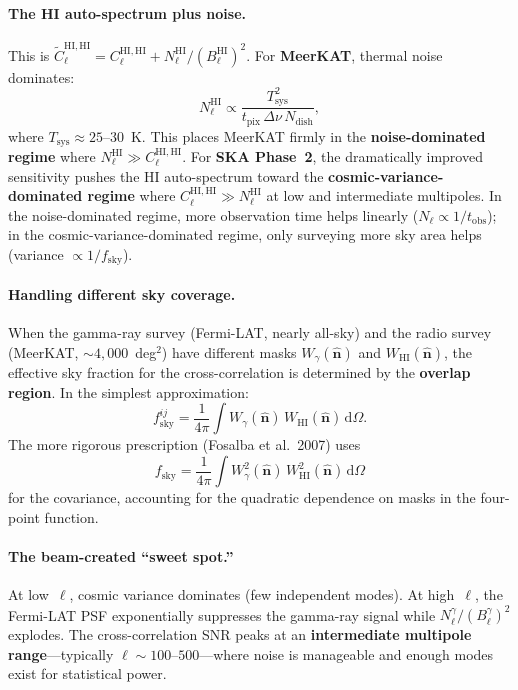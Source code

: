\documentclass[10pt,a4paper]{article}
\newcommand{\Cl}{C_\ell}
\newcommand{\fsky}{f_{\mathrm{sky}}}
\newcommand{\nhat}{\hat{\mathbf{n}}}
\begin{document}
\paragraph{The HI auto-spectrum plus noise.}
This is $\tilde{C}_\ell^{\mathrm{HI,HI}} = \Cl^{\mathrm{HI,HI}} + N_\ell^{\mathrm{HI}}/(B_\ell^{\mathrm{HI}})^2$. For \textbf{MeerKAT}, thermal noise dominates:
\begin{equation}
N_\ell^{\mathrm{HI}} \propto \frac{T_{\mathrm{sys}}^2}
{t_{\mathrm{pix}}\, \Delta\nu\, N_{\mathrm{dish}}},
\end{equation}
where $T_{\mathrm{sys}} \approx 25$--$30$~K. This places MeerKAT firmly in the \textbf{noise-dominated regime} where $N_\ell^{\mathrm{HI}} \gg \Cl^{\mathrm{HI,HI}}$. For \textbf{SKA Phase~2}, the dramatically improved sensitivity pushes the HI auto-spectrum toward the \textbf{cosmic-variance-dominated regime} where $\Cl^{\mathrm{HI,HI}} \gg N_\ell^{\mathrm{HI}}$ at low and intermediate multipoles. In the noise-dominated regime, more observation time helps linearly ($N_\ell \propto 1/t_{\mathrm{obs}}$); in the cosmic-variance-dominated regime, only surveying more sky area helps (variance $\propto 1/\fsky$).

\paragraph{Handling different sky coverage.}
When the gamma-ray survey (Fermi-LAT, nearly all-sky) and the radio survey (MeerKAT, $\sim 4{,}000$~deg$^2$) have different masks $W_\gamma(\nhat)$ and $W_{\mathrm{HI}}(\nhat)$, the effective sky fraction for the cross-correlation is determined by the \textbf{overlap region}. In the simplest approximation:
\begin{equation}
\fsky^{ij} = \frac{1}{4\pi}\int W_\gamma(\nhat)\, W_{\mathrm{HI}}(\nhat)\, \mathrm{d}\Omega.
\end{equation}
The more rigorous prescription (Fosalba et al.\ 2007) uses
\begin{equation}
\fsky = \frac{1}{4\pi}\int W_\gamma^2(\nhat)\, W_{\mathrm{HI}}^2(\nhat)\, \mathrm{d}\Omega
\end{equation}
for the covariance, accounting for the quadratic dependence on masks in the four-point function.

\paragraph{The beam-created ``sweet spot.''}
At low~$\ell$, cosmic variance dominates (few independent modes). At high~$\ell$, the Fermi-LAT PSF exponentially suppresses the gamma-ray signal while $N_\ell^\gamma/(B_\ell^\gamma)^2$ explodes. The cross-correlation SNR peaks at an \textbf{intermediate multipole range}---typically $\ell \sim 100$--$500$---where noise is manageable and enough modes exist for statistical power.
\end{document}
